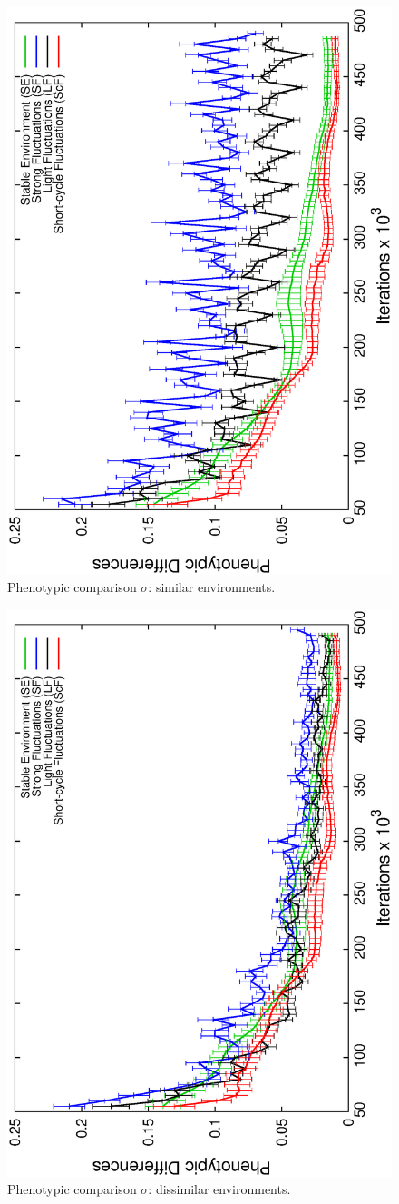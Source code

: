 \begin{figure}[h]
\centering
\includegraphics[width=0.7\columnwidth, angle=-90]{img/diffProp}
\caption{Phenotypic comparison $\sigma$: similar environments.}

\label{fig:dissimilar}
\end{figure}
\begin{figure}[h]

\includegraphics[width=0.7\columnwidth, angle=-90]{img/ProgressProp}
\caption{Phenotypic comparison $\sigma$: dissimilar environments.}
\label{fig:similar}
\end{figure}

